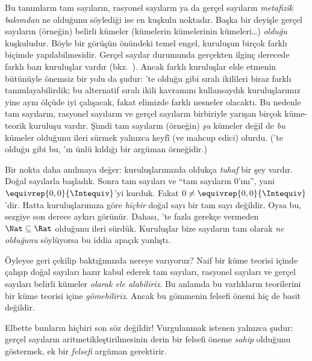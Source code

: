 Bu tanımların tam sayıların, rasyonel sayıların ya da gerçel sayıların
\emph{metafizik bakımdan} ne olduğunu söylediği ise en kuşkulu noktadır. Başka
bir deyişle gerçel sayıların (örneğin) belirli kümeler (kümelerin kümelerinin
kümeleri\ldots) \emph{olduğu} kuşkuludur. Böyle bir görüşün önündeki temel
engel, kuruluşun birçok farklı biçimde yapılabilmesidir. Gerçel sayılar
durumunda gerçekten ilginç derecede farklı bazı kuruluşlar vardır
(bkz.\ ). Ancak farklı kuruluşlar elde etmenin bütünüyle
önemsiz bir yolu da şudur: 'te olduğu gibi sıralı
ikilileri biraz farklı tanımlayabilirdik; bu alternatif sıralı ikili kavramını
kullansaydık kuruluşlarımız yine aynı ölçüde iyi çalışacak, fakat elimizde
farklı nesneler olacaktı. Bu nedenle tam sayıların, rasyonel sayıların ve gerçel
sayıların birbiriyle yarışan birçok küme-teorik kuruluşu vardır. Şimdi tam
sayıların (örneğin) \emph{şu} kümeler değil de \emph{bu} kümeler olduğunu
ileri sürmek yalnızca keyfî (ve mahcup edici) olurdu.
('te olduğu gibi bu, \citealt{Benacerraf1965}'ın
ünlü kıldığı bir argüman örneğidir.)

Bir nokta daha anılmaya değer: kuruluşlarımızda oldukça \emph{tuhaf} bir şey
vardır. Doğal sayılarla başladık. Sonra tam sayıları ve “tam sayıların
$0$'ını”, yani $\equivrep{0,0}{\Intequiv}$'yi kurduk. Fakat
$0 \neq \equivrep{0,0}{\Intequiv}$'dir. Hatta kuruluşlarımıza göre
\emph{hiçbir} doğal sayı bir tam sayı değildir. Oysa bu, sezgiye son derece
aykırı görünür. Dahası, 'te fazla gerekçe vermeden
$\Nat \subseteq \Rat$ olduğunu ileri sürdük. Kuruluşlar bize sayıların tam
olarak \emph{ne olduğunu} söylüyorsa bu iddia apaçık yanlıştı.

Öyleyse geri çekilip baktığımızda nereye varıyoruz? Naif bir küme teorisi
içinde çalışıp doğal sayıları hazır kabul ederek tam sayıları, rasyonel
sayıları ve gerçel sayıları belirli kümeler \emph{olarak ele alabiliriz}. Bu
anlamda bu varlıkların teorilerini bir küme teorisi içine \emph{gömebiliriz}.
Ancak bu gömmenin felsefi önemi hiç de basit değildir.

Elbette bunların hiçbiri son söz değildir!{} Vurgulanmak istenen yalnızca
şudur: gerçel sayıların aritmetikleştirilmesinin derin bir felsefi öneme
\emph{sahip} olduğunu göstermek, ek bir \emph{felsefi} argüman gerektirir.


